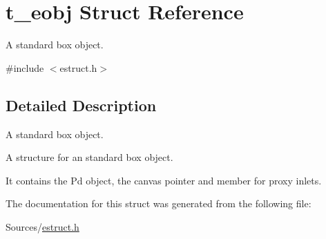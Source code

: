 \hypertarget{structt__eobj}{\section{t\-\_\-eobj Struct Reference}
\label{structt__eobj}
}


A standard box object.  




{\ttfamily \#include $<$estruct.\-h$>$}



\subsection{Detailed Description}
A standard box object. 

A structure for an standard box object.

It contains the Pd object, the canvas pointer and member for proxy inlets. 

The documentation for this struct was generated from the following file\-:\begin{DoxyCompactItemize}
\item 
Sources/\hyperlink{estruct_8h}{estruct.\-h}\end{DoxyCompactItemize}
